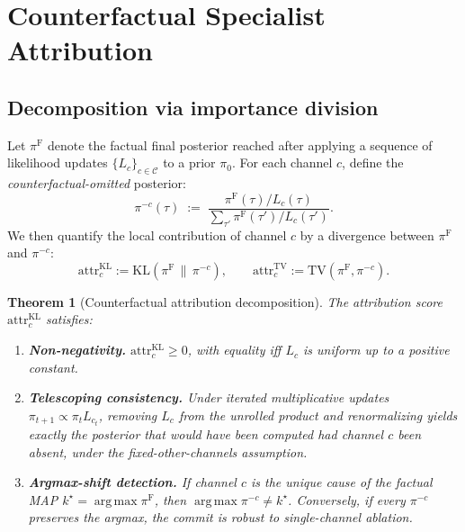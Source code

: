 \documentclass[11pt,a4paper]{article}
\newcommand{\KL}{\mathrm{KL}}
\newcommand{\TV}{\mathrm{TV}}
\newcommand{\Ccal}{\mathcal{C}}
\DeclareMathOperator*{\argmax}{arg\,max}
\theoremstyle{plain}
\newtheorem{theorem}{Theorem}
\theoremstyle{definition}
\theoremstyle{remark}
\begin{document}
\section{Counterfactual Specialist Attribution}
\label{sec:attribution}

\subsection{Decomposition via importance division}

Let $\pi^{\mathrm F}$ denote the factual final posterior reached
after applying a sequence of likelihood updates
$\{L_c\}_{c\in\Ccal}$ to a prior $\pi_0$. For each channel $c$,
define the \emph{counterfactual-omitted} posterior:
\begin{equation}
\label{eq:cf-posterior}
\pi^{-c}(\tau)
  \;:=\;
  \frac{\pi^{\mathrm F}(\tau) / L_c(\tau)}
       {\sum_{\tau'} \pi^{\mathrm F}(\tau') / L_c(\tau')}.
\end{equation}
We then quantify the local contribution of channel $c$ by a
divergence between $\pi^{\mathrm F}$ and $\pi^{-c}$:
\begin{equation}
\mathrm{attr}_c^{\KL} := \KL(\pi^{\mathrm F} \,\|\, \pi^{-c}),
\qquad
\mathrm{attr}_c^{\TV} := \TV(\pi^{\mathrm F}, \pi^{-c}).
\end{equation}

\begin{theorem}[Counterfactual attribution decomposition]
\label{thm:attribution}
The attribution score $\mathrm{attr}_c^{\KL}$ satisfies:
\begin{enumerate}[leftmargin=*]
\item \textbf{Non-negativity.} $\mathrm{attr}_c^{\KL} \geq 0$, with
  equality iff $L_c$ is uniform up to a positive constant.
\item \textbf{Telescoping consistency.} Under iterated multiplicative
  updates $\pi_{t+1} \propto \pi_t L_{c_t}$, removing $L_c$ from the
  unrolled product and renormalizing yields exactly the posterior
  that would have been computed had channel $c$ been absent, under
  the fixed-other-channels assumption.
\item \textbf{Argmax-shift detection.} If channel $c$ is the
  \emph{unique} cause of the factual MAP $k^\star = \argmax \pi^{\mathrm F}$,
  then $\argmax \pi^{-c} \neq k^\star$. Conversely, if every
  $\pi^{-c}$ preserves the argmax, the commit is robust to
  single-channel ablation.
\end{enumerate}
\end{theorem}
\end{document}
